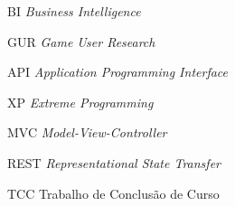 \begin{siglas}
  \item[BI] \textit{Business Intelligence}
  \item[GUR] \textit{Game User Research}
  \item[API] \textit{Application Programming Interface}
  \item[XP] \textit{Extreme Programming}
  \item[MVC] \textit{Model-View-Controller}
  \item[REST] \textit{Representational State Transfer}
  \item[TCC] Trabalho de Conclusão de Curso
\end{siglas}
